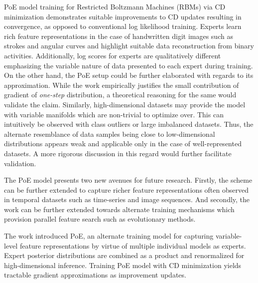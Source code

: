 \documentclass[11pt,letterpaper]{article}
\begin{document}
PoE model training for Restricted Boltzmann Machines (RBMs) via CD minimization demonstrates suitable improvements to CD updates resulting in convergence, as opposed to conventional log likelihood training. Experts learn rich feature representations in the case of handwritten digit images such as strokes and angular curves and highlight suitable data reconstruction from binary activities. Additionally, log scores for experts are qualitatively different emphasizing the variable nature of data presented to each expert during training. On the other hand, the PoE setup could be further elaborated with regards to its approximation. While the work empirically justifies the small contribution of gradient of \textit{one-step} distribution, a theoretical reasoning for the same would validate the claim. Similarly, high-dimensional datasets may provide the model with variable manifolds which are non-trivial to optimize over. This can intuitively be observed with class outliers or large imbalanced datasets. Thus, the alternate resemblance of data samples being close to low-dimensional distributions appears weak and applicable only in the case of well-represented datasets. A more rigorous discussion in this regard would further facilitate validation. 

The PoE model presents two new avenues for future research. Firstly, the scheme can be further extended to capture richer feature representations often observed in temporal datasets such as time-series and image sequences. And secondly, the work can be further extended towards alternate training mechanisms which provision parallel feature search such as evolutionary methods. 

The work introduced PoE, an alternate training model for capturing variable-level feature representations by virtue of multiple individual models as experts. Expert posterior distributions are combined as a product and renormalized for high-dimensional inference. Training PoE model with CD minimization yields tractable gradient approximations as improvement updates.
\end{document}
